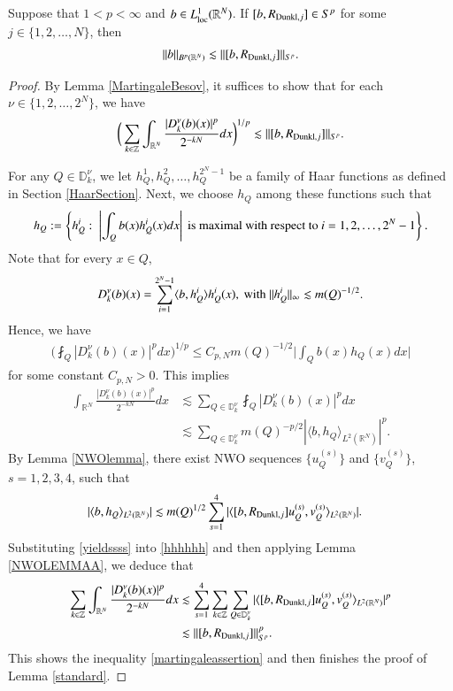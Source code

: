 \documentclass[12pt]{amsart}
\begin{document}
\begin{lemma}\label{standard}
Suppose that $1< p<\infty$ and $b\in L^1_{\rm loc}(\mathbb{R}^N)$. If $[b,R_{{\rm Dunkl},j}]\in S^p$ for some $j\in\{1,2,\ldots,N\}$, then
\[
\|b\|_{B^p(\mathbb{R}^N)}\lesssim \|[b,R_{{\rm Dunkl},j}]\|_{S^p}.
\]
\end{lemma}
\begin{proof}
By Lemma \ref{MartingaleBesov}, it suffices to show that
for each $\nu\in\{1,2,\ldots,2^N\}$, we have
\begin{align}\label{martingaleassertion}
  \bigg(\sum_{k\in\mathbb{Z}}\int_{\mathbb{R}^N}\frac{|D_k^\nu(b)(x)|^p}{2^{-kN}}dx\bigg)^{1/p}\lesssim\|[b,R_{{\rm Dunkl},j}]\|_{S^p}.
\end{align}

  For any $Q\in\mathbb{D}_k^\nu$, we let $h_Q^1,h_Q^2,\ldots,h_Q^{2^N-1}$ be a family of Haar functions as defined in Section \ref{HaarSection}. Next, we choose $h_Q$ among these functions such that
  $$h_Q:=\left\{h_Q^i:\ \left|\int_Qb(x)h_Q^i(x)dx\right|\ {\rm is}\ {\rm maximal}\ {\rm with}\ {\rm respect}\ {\rm to}\ i=1,2,\dots,2^{N}-1\right\}.$$
Note that for every $x\in Q$, $$D_k^{\nu}(b)(x)=\sum_{i=1}^{2^N-1}\langle b,h_Q^i\rangle h_Q^i(x),\ {\rm with}\ \|h_Q^i\|_{\infty}\lesssim m(Q)^{-1/2}.$$ Hence, we have
\begin{align}
  \bigg(\fint_Q |D_k^\nu(b)(x)|^pdx\bigg)^{1/p}\leq C_{p,N} m(Q)^{-1/2}\bigg|\int_Qb(x)h_Q(x)dx\bigg|
\end{align}
for some constant $C_{p,N}>0$.
This implies
\begin{align}\label{hhhhhh}
  \int_{\mathbb{R}^N}\frac{|D_k^\nu(b)(x)|^p}{2^{-kN}}dx
  &\lesssim \sum_{Q\in\mathbb{D}_k^\nu}\fint_Q|D_k^\nu(b)(x)|^pdx\nonumber\\
  &\lesssim \sum_{Q\in\mathbb{D}_k^\nu}m(Q)^{-p/2}|\langle b,h_Q\rangle_{L^2(\mathbb{R}^N)}|^p.
\end{align}
By Lemma \ref{NWOlemma}, there exist NWO sequences $\{u_{Q}^{(s)}\}$ and $\{v_{Q}^{(s)}\}$, $s=1,2,3,4$, such that
\begin{align}\label{yieldssss}
  |\langle b,h_Q\rangle_{L^2(\mathbb{R}^N)}|&\lesssim m(Q)^{1/2}\sum_{s=1}^4|\langle [b,R_{{\rm Dunkl},j}]u_{Q}^{(s)},v_{Q}^{(s)}\rangle_{L^2(\mathbb{R}^N)}|.
\end{align}
Substituting \eqref{yieldssss} into \eqref{hhhhhh} and then applying Lemma \ref{NWOLEMMAA}, we deduce that
\begin{align*}
  \sum_{k\in\mathbb{Z}}\int_{\mathbb{R}^N}\frac{|D_k^\nu(b)(x)|^p}{2^{-kN}}dx
  &\lesssim \sum_{s=1}^4\sum_{k\in\mathbb{Z}}\sum_{Q\in\mathbb{D}_k^\nu}|\langle [b,R_{{\rm Dunkl},j}]u_{Q}^{(s)},v_{Q}^{(s)}\rangle_{L^2(\mathbb{R}^N)}|^p\nonumber\\
  &\lesssim \|[b,R_{{\rm Dunkl},j}]\|_{S^p}^p.
\end{align*}
This shows the inequality \eqref{martingaleassertion} and then finishes the proof of Lemma \ref{standard}.
\end{proof}
\end{document}
